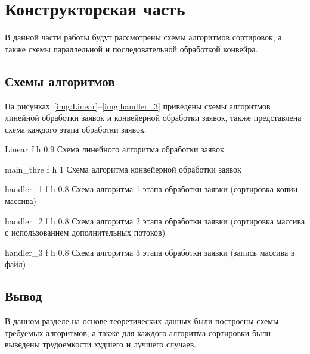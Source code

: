 \chapter{Конструкторская часть}
В данной части работы будут рассмотрены схемы алгоритмов сортировок, а также схемы параллельной и последовательной обработкой конвейра.








\section{Схемы алгоритмов}
На рисунках~\ref{img:Linear}--\ref{img:handler_3} приведены схемы алгоритмов линейной обработки заявок и конвейерной обработки заявок, также представлена схема
каждого этапа обработки заявок.

{Linear} %
{f} %
{h} %
{0.9\textwidth} %
{Схема линейного алгоритма обработки заявок} %



{main_thre} %
{f} %
{h} %
{1\textwidth} %
{Схема алгоритма конвейерной обработки заявок} %


{handler_1} %
{f} %
{h} %
{0.8\textwidth} %
{Схема алгоритма 1 этапа обработки заявки (сортировка копии массива)} %

{handler_2} %
{f} %
{h} %
{0.8\textwidth} %
{Схема алгоритма 2 этапа обработки заявки (сортировка массива с использованием дополнительных потоков)} %

{handler_3} %
{f} %
{h} %
{0.8\textwidth} %
{Схема алгоритма 3 этапа обработки заявки (запись массива в файл)} %






\section*{Вывод}

В данном разделе на основе теоретических данных были построены схемы
требуемых алгоритмов, а также для каждого алгоритма сортировки были выведены трудоемкости худшего и лучшего случаев.









